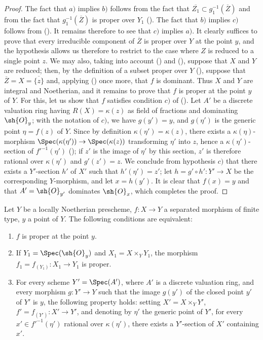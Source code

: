 \begin{proof}
The fact that $a)$ implies $b)$ follows from the fact that $\overline{Z_1}\subset g_1^{-1}(\overline{Z})$ and from the fact that $g_1^{-1}(\overline{Z})$ is proper over $Y_1$ ().
The fact that $b)$ implies $c)$ follows from ().
It remains therefore to see that $c)$ implies $a)$.
It clearly suffices to prove that every irreducible component of $\overline{Z}$ is proper over $Y$ at the point $y$, and the hypothesis allows us therefore to restrict to the case where $Z$ is reduced to a single point $z$.
We may also, taking into account () and (), suppose that $X$ and $Y$ are reduced; then, by the definition of a subset proper over $Y$ (), suppose that $\overline{Z}=X=\overline{\{z\}}$ and, applying () once more, that $f$ is dominant. Thus $X$ and $Y$ are integral and Noetherian, and it remains to prove that $f$ is proper at the point $y$ of $Y$. For this, let us show that $f$ satisfies condition $c)$ of ().
Let $A'$ be a discrete valuation ring having $R(X)=\kappa(z)$ as field of fractions and dominating $\sh{O}_y$; with the notation of $c)$, we have $g(y')=y$, and $g(\eta')$ is the generic point $\eta=f(z)$ of $Y$.
Since by definition $\kappa(\eta')=\kappa(z)$, there exists a $\kappa(\eta)$-morphism $\Spec(\kappa(\eta'))\to\Spec(\kappa(z))$ transforming $\eta'$ into $z$, hence a $\kappa(\eta')$-section of $f'^{-1}(\eta')$ (); if $z'$ is the image of $\eta'$ by this section, $z'$ is therefore rational over $\kappa(\eta')$ and $g'(z')=z$.
We conclude from hypothesis $c)$ that there exists a $Y'$-section $h'$ of $X'$ such that $h'(\eta')=z'$; let $h=g'\circ h':Y'\to X$ be the corresponding $Y$-morphism, and let $x=h(y')$. It is clear that $f(x)=y$ and that $A'=\sh{O}_{y'}$ dominates $\sh{O}_x$, which completes the proof.
\end{proof}

\begin{corollary}[15.7.5]
\label{IV.15.7.5}
Let $Y$ be a locally Noetherian prescheme, $f:X\to Y$ a separated morphism of finite type, $y$ a point of $Y$.
The following conditions are equivalent:
\begin{enumerate}[label=\emph{\alph*)}]
  \item $f$ is proper at the point $y$.
  \item If $Y_1=\Spec(\sh{O}_y)$ and $X_1=X\times_Y Y_1$, the morphism $f_1=f_{(Y_1)}:X_1\to Y_1$ is proper.
  \item For every scheme $Y'=\Spec(A')$, where $A'$ is a discrete valuation ring, and every morphism $g:Y'\to Y$ such that the image $g(y')$ of the closed point $y'$ of $Y'$ is $y$, the following property holds: setting $X'=X\times_Y Y'$, $f'=f_{(Y')}:X'\to Y'$, and denoting by $\eta'$ the generic point of $Y'$, for every $x'\in f'^{-1}(\eta')$ rational over $\kappa(\eta')$, there exists a $Y'$-section of $X'$ containing $x'$.
\end{enumerate}
\end{corollary}

